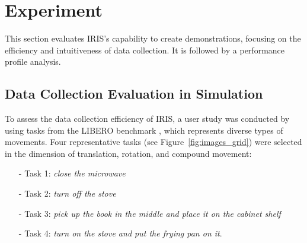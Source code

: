 \section{Experiment}

This section evaluates IRIS's capability to create demonstrations, focusing on the efficiency and intuitiveness of data collection.
It is followed by a performance profile analysis.

\subsection{Data Collection Evaluation in Simulation}





% 
To assess the data collection efficiency of IRIS, a user study was conducted by using tasks from the LIBERO benchmark \cite{liu2024libero}, which represents diverse types of movements.
Four representative tasks (see Figure~\ref{fig:images_grid}) were selected in the dimension of translation, rotation, and compound movement:
\begin{itemize}
\item[-] Task 1: \textit{close the microwave}
\item[-] Task 2: \textit{turn off the stove}
\item[-] Task 3: \textit{pick up the book in the middle and place it on the cabinet shelf}
\item[-] Task 4: \textit{turn on the stove and put the frying pan on it}.
\end{itemize}

